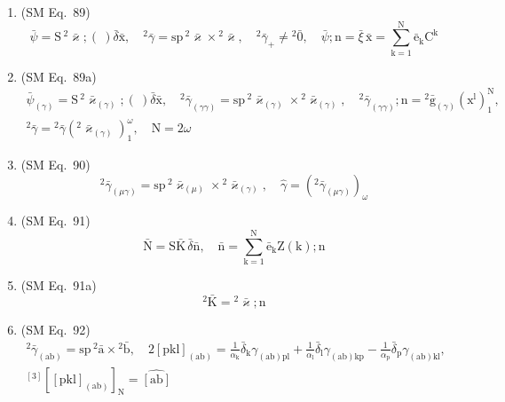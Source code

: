 \documentclass[12pt]{article}
\begin{document}
\begin{enumerate}[label=(\arabic*), series=formellist]
    \item (SM Eq.\ 89) 
    \[
    \bar{\psi} = \mathrm{S}\,{}^2\bar{\varkappa};(\ )\bar{\delta}\bar{\mathrm{x}}, \quad {}^2\bar{\gamma} = \mathrm{sp}\,{}^2\bar{\varkappa} \times {}^2\bar{\varkappa}, \quad {}^2\bar{\gamma}_+ \ne {}^2\bar{0}, \quad \bar{\psi};\mathrm{n} = \bar{\xi}\,\bar{\mathrm{x}} = \sum_{\mathrm{k}=1}^\mathrm{N} \bar{\mathrm{e}}_\mathrm{k} \mathrm{C^k}
    \]

    \item (SM Eq.\ 89a) 
    \[
    \begin{gathered}
    \bar{\psi}_{(\gamma)} = \mathrm{S}\,{}^2\bar{\varkappa}_{(\gamma)};(\ )\bar{\delta}\bar{\mathrm{x}}, \quad {}^2\bar{\gamma}_{(\gamma\gamma)} = \mathrm{sp}\,{}^2\bar{\varkappa}_{(\gamma)} \times {}^2\bar{\varkappa}_{(\gamma)}, \quad {}^2\bar{\gamma}_{(\gamma\gamma)};\mathrm{n} = {}^2\bar{\mathrm{g}}_{(\gamma)} \left( \mathrm{x^l} \right)_1^\mathrm{N}, \\
    {}^2\bar{\gamma} = {}^2\bar{\gamma}\left({}^2\bar{\varkappa}_{(\gamma)}\right)_1^\omega, \quad \mathrm{N} = 2\omega
    \end{gathered}
    \]

    \item (SM Eq.\ 90) 
    \[
    {}^2\bar{\gamma}_{(\mu\gamma)} = \mathrm{sp}\,{}^2\bar{\varkappa}_{(\mu)} \times {}^2\bar{\varkappa}_{(\gamma)}, \quad \hat{\gamma} = \left( {}^2\bar{\gamma}_{(\mu\gamma)} \right)_\omega
    \]

    \item (SM Eq.\ 91) 
    \[
    \bar{\mathrm{N}} = \mathrm{S}\bar{\mathrm{K}}\,\bar{\delta}\bar{\mathrm{n}}, \quad \bar{\mathrm{n}} = \sum_{\mathrm{k}=1}^\mathrm{N} \bar{\mathrm{e}}_\mathrm{k} \mathrm{Z}(\mathrm{k});\mathrm{n}
    \]

    \item (SM Eq.\ 91a) 
    \[
    {}^2\bar{\mathrm{K}} = {}^2\bar{\varkappa};\mathrm{n}
    \]

    \item (SM Eq.\ 92) 
    \[
    \begin{gathered}
    {}^2\bar{\gamma}_{(\mathrm{ab})} = \mathrm{sp}\,{}^2\bar{\mathrm{a}} \times {}^2\bar{\mathrm{b}}, \quad 2\left[\mathrm{pkl}\right]_{(\mathrm{ab})} = \frac{1}{\alpha_\mathrm{k}}\bar{\delta}_\mathrm{k} \gamma_{(\mathrm{ab})\mathrm{pl}} + \frac{1}{\alpha_\mathrm{l}}\bar{\delta}_\mathrm{l} \gamma_{(\mathrm{ab})\mathrm{kp}} - \frac{1}{\alpha_\mathrm{p}}\bar{\delta}_\mathrm{p} \gamma_{(\mathrm{ab})\mathrm{kl}}, \\
    {}^{[3]}\left[ \left[ \mathrm{pkl} \right]_{(\mathrm{ab})} \right]_\mathrm{N} = \widehat{\left[ \mathrm{ab} \right]}
    \end{gathered}
    \]


\end{enumerate}
\end{document}
